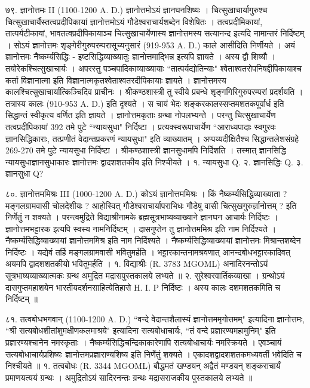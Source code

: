 ७९. ज्ञानोत्तमः II (1100-1200 A. D.)
ज्ञानोत्तमोऽयं ज्ञानघनशिष्यः । चित्सुखाचार्यागुरुश्च चित्सुखाचार्यैस्तत्वप्रदीपिकायां ज्ञानोत्तमोऽयं गौडेश्वराचार्यशब्देन विशेषितः । तत्वप्रदीमिकायां, तात्पर्यटीकायां, भावतत्वप्रदीपिकायाञ्च चित्सुखाचार्येणास्य ज्ञानोत्तमस्य सत्यानन्द इत्यदि नामान्तरं निर्दिष्टम् । सोऽयं ज्ञानोत्तमः शृङ्गेरीगुरुपरम्परासूच्यनुसारं (919-953 A. D.) काले आसीदिति निर्णीयते ।
अयं ज्ञानोत्तमः नैष्कर्म्यसिद्धिः - इष्टसिद्धिव्याख्यातुः ज्ञानोत्तमाद्भिन्न इत्यपि ज्ञायते । अस्य द्वौ शिष्यौ । तयोरेकश्चित्सुखाचार्यः । अपरस्तु पञ्चपादिकाव्याख्यायाः ``तात्पर्यद्योतिन्याः" श्वेताश्वतरोपनिषद्दीपिकायाश्च कर्ता विज्ञानात्मा इति विज्ञानात्मकृतश्वेताश्वतरदीपिकायाः ज्ञायते ।
ज्ञानोत्तमस्य कालश्चित्सुखाचार्यात्किञ्चिदिव प्राचीनः । श्रीकण्ठशास्त्री तु स्वीये प्रबन्धे शृङ्गगिरिगुरुपरम्परां प्रदर्शयति । तत्रास्य कालः (910-953 A. D.) इति दृश्यते । स चायं भेदः शङ्करकालस्सप्तमशतकपूर्वार्ध इति सिद्धान्तं स्वीकृत्य वर्णित इति ज्ञायते ।
ज्ञानोत्तमकृताः ग्रन्था नोपलभ्यन्ते । परन्तु चित्सुखाचार्येण तत्वप्रदीपिकायां 392 तमे पुटे ``न्यायसुधा" निर्दिष्टा । प्रत्यक्स्वरूपाचार्येण ``आराध्यपादाः स्वगुरवः ज्ञानसिद्धिकाराः, तत्प्रणीतं वेदान्तप्रकरणं न्यायसुधा" इति व्याख्यातम् । अप्पय्यदीक्षितैश्च सिद्धान्तलेशसंग्रहे 269-270 तमे पुटे न्यायसुधा निर्दिष्टा । श्रीकण्ठशास्त्री ज्ञानसुधामपि निर्दिशति । तस्मात् ज्ञानसिद्धि न्यायसुधाज्ञानसुधाकारः ज्ञानोत्तमः द्वादशशतकीय इति निश्चीयते ।
१. न्यायसुधा Q.
२. ज्ञानसिद्धिः Q.
३. ज्ञानसुधा Q?

८०. ज्ञानोत्तममिश्रः III (1000-1200 A. D.)
कोऽयं ज्ञानोत्तममिश्रः । किं नैष्कर्म्यसिद्धिव्याख्याता ? मङ्गलग्रामवासी चोलदेशीयः ? आहोस्वित् गौडेश्वराचार्यापराभिधः गौडेषु वासी चित्सुखगुरुर्ज्ञानोत्तम् ? इति निर्णेतुं न शक्यते । परन्त्वमुद्रिते विद्याश्रीनामके ब्रह्मसूत्रभाष्यव्याख्याने ज्ञानघन आचार्यः निर्दिष्टः । ज्ञानोत्तमभट्टारक इत्यपि स्वस्य नामनिर्दिष्टम् । दासगुप्तेन तु ज्ञानोत्तममिश्र इति नाम निर्दिश्यते । नैष्कर्म्यसिद्धिव्याख्यायां ज्ञानोत्तममिश्र इति नाम निर्दिश्यते । नैष्कर्म्यसिद्धिव्याख्यायां ज्ञानोत्तमः मिश्रान्तशब्देन निर्दिष्टः । यद्येवं तर्हि मङ्गलग्रामवासी भवितुमर्हति । भट्टारकान्तनामश्रवणात् आनन्दबोधभट्टारकादिवत् अयमपि द्वादशशतकीयो भवितुमर्हति । 
१. विद्याश्रीः (R. 3783 MGOML)
अनादिरनन्तोऽयं सूत्रभाष्यव्याख्यात्मकः ग्रन्थ अमुद्रित मद्रासपुस्तकालये लभ्यते ॥
२. सुरेश्वरवार्तिकव्याखा । ग्रन्थोऽयं दासगुप्तमहाशयेन भारतीयदर्शनसाहित्येतिहासे H. I. P निर्दिष्टः । अस्य कालः दशमशतकमिति च निर्दिष्टम् ॥

८१. तत्वबोधभगवान् (1100-1200 A. D.)
``वन्दे वेदान्तशैलास्यं ज्ञानोत्तममृगोत्तमम्" इत्यादिना ज्ञानोत्तमः, ``श्री सत्यबोधशीतांशुमक्षीणकलमाश्रये" इत्यादिना सत्यबोधाचार्यः, ``तं वन्दे प्रज्ञारण्यमहामुनिम्" इति प्रज्ञारण्यश्चानेन नमस्कृताः । नैष्कर्म्यसिद्धिचन्द्रिकाकारेणापि सत्यबोधाचार्यः नमस्क्रियते । एवञ्चायं सत्यबोधाचार्यप्रशिष्यः ज्ञानोत्तमप्रज्ञाराण्यशिष्य इति निर्णेतुं शक्यते । एकादशद्वादशशतकमध्यवर्ती भवेदिति च निश्चीयते ॥
१. तत्वबोधः (R. 3344 MGOML) बौद्धमतं खण्डयन् अद्वैतं मण्डयन् शङ्कराचार्यं प्रमाणयत्ययं ग्रन्थः । अमुद्रितोऽयं सादिरनन्तः ग्रन्थः मद्रासराजकीय पुस्तकालये लभ्यते ॥

